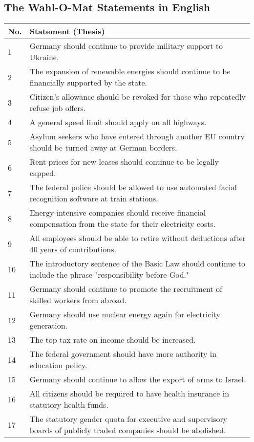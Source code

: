 \documentclass[
	fontsize=10pt,          %
	numbers=noenddot,    	%
    parskip=half,        	%
    listof=totoc,        	%
    bibliography=totoc,  	%
	headsepline=true,       %
	footsepline=false, 		%
    DIV=12                	%
]{scrartcl}
\begin{document}
\subsection{The Wahl-O-Mat Statements in English}

\begin{longtable}{p{1cm}p{14cm}}
    \toprule
    \textbf{No.} & \textbf{Statement (Thesis)} \\
    \midrule
    \endhead
    1 & Germany should continue to provide military support to Ukraine. \\
    2 & The expansion of renewable energies should continue to be financially supported by the state. \\
    3 & Citizen’s allowance should be revoked for those who repeatedly refuse job offers. \\
    4 & A general speed limit should apply on all highways. \\
    5 & Asylum seekers who have entered through another EU country should be turned away at German borders. \\
    6 & Rent prices for new leases should continue to be legally capped. \\
    7 & The federal police should be allowed to use automated facial recognition software at train stations. \\
    8 & Energy-intensive companies should receive financial compensation from the state for their electricity costs. \\
    9 & All employees should be able to retire without deductions after 40 years of contributions. \\
    10 & The introductory sentence of the Basic Law should continue to include the phrase "responsibility before God." \\
    11 & Germany should continue to promote the recruitment of skilled workers from abroad. \\
    12 & Germany should use nuclear energy again for electricity generation. \\
    13 & The top tax rate on income should be increased. \\
    14 & The federal government should have more authority in education policy. \\
    15 & Germany should continue to allow the export of arms to Israel. \\
    16 & All citizens should be required to have health insurance in statutory health funds. \\
    17 & The statutory gender quota for executive and supervisory boards of publicly traded companies should be abolished. \\

\end{longtable}
\end{document}
